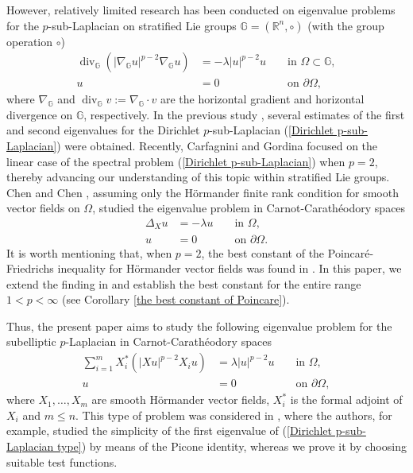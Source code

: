 \documentclass[a4paper,12pt,reqno]{amsart}
\renewcommand\eqref[1]{(\ref{#1})} %
\numberwithin{equation}{section}
\theoremstyle{plain}
\theoremstyle{definition}
\begin{document}
However, relatively limited research has been conducted on  eigenvalue problems for the $p$-sub-Laplacian on  stratified Lie groups $\mathbb{G}=\left(\mathbb{R}^{n}, \circ\right)$ (with the group operation $\circ$) 
\begin{equation}\label{Dirichlet p-sub-Laplacian}
\begin{aligned}
\operatorname{div}_{\mathbb{G}}\left(\left|\nabla_{\mathbb{G}} u\right|^{p-2} \nabla_{\mathbb{G}} u\right)&=-\lambda|u|^{p-2} u  &&\text { in } \Omega\subset \mathbb{G}, \\
u&=0 &&\text { on } \partial \Omega,
\end{aligned}
\end{equation}
where $\nabla_{\mathbb{G}}$ and  $\operatorname{div}_{\mathbb{G}} v:=\nabla_{\mathbb{G}} \cdot v$ are the horizontal gradient and  horizontal divergence on $\mathbb{G}$, respectively. In the previous study \cite{WNL2009}, several estimates of the first and second eigenvalues for the Dirichlet $p$-sub-Laplacian \eqref{Dirichlet p-sub-Laplacian} were obtained. Recently, Carfagnini and Gordina \cite{ CG2024} focused on the linear case of the spectral problem \eqref{Dirichlet p-sub-Laplacian} when $p=2$, thereby advancing our understanding of this topic within stratified Lie groups.  Chen and Chen \cite{Chen2021}, assuming only the H\"ormander finite rank condition for smooth vector fields on $\Omega$, studied the eigenvalue problem in Carnot-Carath\'eodory spaces
\begin{equation*}
\begin{aligned}
\Delta_{X} u&=-\lambda u  &&\text { in } \Omega, \\
u&=0 &&\text { on } \partial \Omega.
\end{aligned}
\end{equation*}
It is worth mentioning that, when $p=2$, the best constant of the Poincar\'e-Friedrichs inequality for H\"ormander vector fields was found in \cite{Chen2021}. In this paper, we extend the finding in \cite{Chen2021} and establish the best constant for the entire range $1<p<\infty$ (see Corollary \ref{the best constant of Poincare}). 

Thus, the present paper aims to study the following eigenvalue problem for the subelliptic $p$-Laplacian in Carnot-Carath\'eodory spaces
\begin{equation}\label{Dirichlet p-sub-Laplacian type}
\begin{aligned}
\sum_{i=1}^{m}X_{i}^{*}\left(\left|X u\right|^{p-2} X_{i}u\right)&=\lambda|u|^{p-2} u  &&\text { in } \Omega, \\
u&=0 &&\text { on } \partial \Omega,
\end{aligned}
\end{equation}
where $X_{1}, \ldots, X_{m}$  are smooth  H\"ormander vector fields, $X_{i}^{*}$ is the formal adjoint of $X_{i}$ and $m\leq n$. This type of problem was considered in \cite{RSS2021}, where the authors, for example, studied the simplicity of the first eigenvalue of \eqref{Dirichlet p-sub-Laplacian type} by means of the Picone identity, whereas we prove it by choosing suitable test functions.
\end{document}
